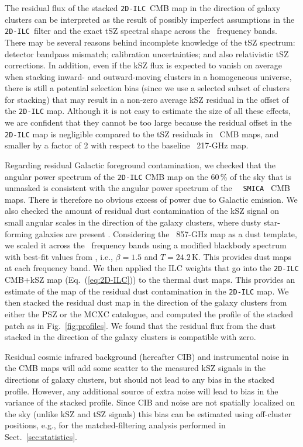 \documentclass[traditabstract, longauth]{aa}
\newcommand{\twodilc}{{\tt 2D-ILC}}
\newcommand{\1}{\'\i }
\begin{document}
The residual flux of the stacked \twodilc\ CMB map in the direction of galaxy
clusters can be interpreted as the result of possibly imperfect assumptions in
the \twodilc\ filter and the exact tSZ spectral shape across the \Planck\
frequency bands. There may be several reasons behind incomplete knowledge
of the tSZ spectrum: detector bandpass mismatch; calibration
uncertainties; and also relativistic tSZ corrections. In addition, even if the
kSZ flux is expected to vanish on average when stacking inward- and
outward-moving clusters in a homogeneous universe, there is still a
potential selection bias
(since we use a selected subset of clusters for stacking) that may
result in a non-zero average kSZ residual in the offset of the {\tt 2D-ILC}
map.  Although it is not easy to estimate the size of all these effects, we are
confident that they cannot be too large because
the residual offset in the {\tt 2D-ILC} map is negligible
compared to the tSZ residuals in \Planck\ CMB maps, and smaller by a factor
of 2 with respect to the baseline \Planck\ 217-GHz map.

Regarding residual Galactic foreground contamination, we checked that the
angular power spectrum of the {\tt 2D-ILC} CMB map on the
60\,\% of the sky that is
unmasked is consistent with the angular power spectrum of the \Planck\ {\tt
SMICA\,} CMB maps. There is therefore no obvious excess of power due to
Galactic emission. We also checked the amount of residual dust contamination of the kSZ signal on small angular scales in the direction of the galaxy clusters, where dusty star-forming galaxies are present \citep{planck2016-XLIII}. Considering the \Planck\ 857-GHz map as a dust template, we scaled it across the \Planck\ frequency bands using a modified blackbody spectrum with best-fit values from \citet{planck2016-XLIII}, i.e., $\beta=1.5$ and $T=24.2$\,K. This provides dust maps at each frequency band. We then applied the ILC weights that go into the {\tt 2D-ILC} CMB+kSZ map (Eq.~(\ref{eq:2D-ILC})) to the thermal dust maps. This provides an estimate of the map of the residual dust contamination in the {\tt 2D-ILC} map. We then stacked the residual dust map in the direction of the galaxy clusters from either the PSZ or the MCXC catalogue, and computed the profile of the stacked patch as in Fig.~\ref{fig:profiles}. We found that the residual flux from the dust stacked in the direction of the galaxy clusters is compatible with zero.

Residual cosmic infrared background (hereafter CIB) and instrumental noise in the CMB maps will add some scatter to
the measured kSZ signals in the directions of galaxy clusters, but should not
lead to any bias in the stacked profile. However, any additional source of
extra noise will lead to bias in the variance of the stacked profile. Since CIB
and noise are not spatially localized on the sky (unlike kSZ and tSZ signals)
this bias can be estimated using off-cluster positions, e.g., for the
matched-filtering analysis performed in Sect.~\ref{sec:statistics}.
\end{document}
